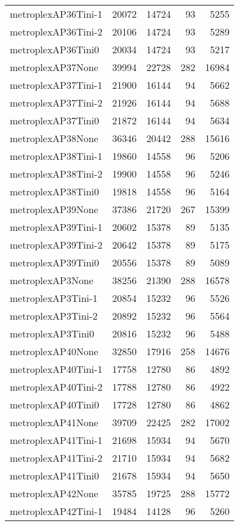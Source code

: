 \begin{longtable}{lrrrr}
metroplexAP36Tini-1 & 20072 & 14724 & 93 & 5255 \\
metroplexAP36Tini-2 & 20106 & 14724 & 93 & 5289 \\
metroplexAP36Tini0 & 20034 & 14724 & 93 & 5217 \\
metroplexAP37None & 39994 & 22728 & 282 & 16984 \\
metroplexAP37Tini-1 & 21900 & 16144 & 94 & 5662 \\
metroplexAP37Tini-2 & 21926 & 16144 & 94 & 5688 \\
metroplexAP37Tini0 & 21872 & 16144 & 94 & 5634 \\
metroplexAP38None & 36346 & 20442 & 288 & 15616 \\
metroplexAP38Tini-1 & 19860 & 14558 & 96 & 5206 \\
metroplexAP38Tini-2 & 19900 & 14558 & 96 & 5246 \\
metroplexAP38Tini0 & 19818 & 14558 & 96 & 5164 \\
metroplexAP39None & 37386 & 21720 & 267 & 15399 \\
metroplexAP39Tini-1 & 20602 & 15378 & 89 & 5135 \\
metroplexAP39Tini-2 & 20642 & 15378 & 89 & 5175 \\
metroplexAP39Tini0 & 20556 & 15378 & 89 & 5089 \\
metroplexAP3None & 38256 & 21390 & 288 & 16578 \\
metroplexAP3Tini-1 & 20854 & 15232 & 96 & 5526 \\
metroplexAP3Tini-2 & 20892 & 15232 & 96 & 5564 \\
metroplexAP3Tini0 & 20816 & 15232 & 96 & 5488 \\
metroplexAP40None & 32850 & 17916 & 258 & 14676 \\
metroplexAP40Tini-1 & 17758 & 12780 & 86 & 4892 \\
metroplexAP40Tini-2 & 17788 & 12780 & 86 & 4922 \\
metroplexAP40Tini0 & 17728 & 12780 & 86 & 4862 \\
metroplexAP41None & 39709 & 22425 & 282 & 17002 \\
metroplexAP41Tini-1 & 21698 & 15934 & 94 & 5670 \\
metroplexAP41Tini-2 & 21710 & 15934 & 94 & 5682 \\
metroplexAP41Tini0 & 21678 & 15934 & 94 & 5650 \\
metroplexAP42None & 35785 & 19725 & 288 & 15772 \\
metroplexAP42Tini-1 & 19484 & 14128 & 96 & 5260 \\

\end{longtable}
